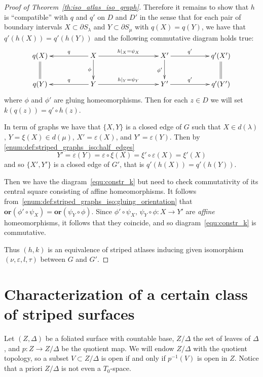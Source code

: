 \documentclass[12pt, reqno]{amsart}
\newcommand\Vsp{V}
\newcommand\dif{h}
\newcommand{\Partition}{\Delta}
\newcommand{\strip}{S}
\newcommand{\stripSurf}{Z}
\newcommand{\bdX}{X}
\newcommand{\bdY}{Y}
\newcommand{\stInd}{{\lambda}}
\newcommand{\qmap}{q}
\newcommand\Gr{G}
\newcommand\ori{\mathbf{or}}
\newcommand\lori{l}
\newcommand\tori{\tau}
\newcommand\edge[2]{\{#1,#2\}}
\newcommand\eiso{\varepsilon}
\newcommand\viso{\nu}
\begin{document}
\begin{proof}[Proof of Theorem~\ref{th:iso_atlas_iso_graph}]
Therefore it remains to show that $\dif$ is ``compatible'' with $\qmap$ and $\qmap'$ on $D$ and $D'$ in the sense that for each pair of boundary intervals $\bdX\subset\partial\strip_{\stInd}$ and $\bdY\subset\partial\strip_{\mu}$ with $\qmap(\bdX) = \qmap(\bdY)$, 
we have that $\qmap'(\dif(\bdX))=\qmap'(\dif(\bdY))$ and the following commutative diagram holds true:
\begin{equation}\label{equ:constr_k}
\xymatrix{
\qmap(\bdX)\ar@{=}[d] && \bdX \ar[ll]_-{\qmap} \ar[rrr]^-{\dif|_{\bdX} = \psi_{\bdX}} \ar[d]_-{\phi} 
&&& \bdX' \ar[rr]^-{\qmap'} \ar[d]_{\phi'} && \qmap'(\bdX')\ar@{=}[d] \\
\qmap(\bdY) && \bdY \ar[ll]_-{\qmap} \ar[rrr]^-{\dif|_{\bdY} = \psi_{\bdY}}
&&& \bdY' \ar[rr]^-{\qmap'}        && \qmap'(\bdY')
}
\end{equation}
where $\phi$ and $\phi'$ are gluing homeomorphisms.
Then for each $z\in D$ we will set $k(\qmap(z)) = \qmap'\circ \dif(z)$.


In term of graphs we have that $\edge{\bdX}{\bdY}$ is a closed edge of $\Gr$ such that $\bdX\in d(\stInd)$, $\bdY=\xi(\bdX)\in d(\mu)$, $\bdX'=\eiso(\bdX)$, and $\bdY'=\eiso(\bdY)$.
Then by \ref{enum:def:striped_graphs_iso:half_edges}
\[
\bdY' = \eiso(\bdY) = \eiso\circ \xi(\bdX) = \xi' \circ \eiso(\bdX) = \xi'(\bdX)
\]
and so $\{\bdX', \bdY'\}$ is a closed edge of $\Gr'$, that is $\qmap'(\dif(\bdX))=\qmap'(\dif(\bdY))$.

Then we have the diagram~\eqref{equ:constr_k} but need to check commutativity of its central square consisting of affine homeomorphisms.
It follows from~\ref{enum:def:striped_graphs_iso:gluing_orientation} that $\ori(\phi' \circ \psi_{\bdX}) = \ori(\psi_{\bdY}\circ \phi)$.
Since $\phi' \circ \psi_{\bdX}, \,\psi_{\bdY}\circ \phi: \bdX \to \bdY'$ are \textit{affine} homeomorphisms, it follows that they coincide, and so diagram~\eqref{equ:constr_k} is commutative.

Thus $(\dif,k)$ is an equivalence of striped atlases inducing given isomorphism $(\viso,\eiso,\lori, \tori)$ between $\Gr$ and $\Gr'$. 
\end{proof}

\section{Characterization of a certain class of striped surfaces}\label{sect:charact_str_prop}
Let $(\stripSurf,\Partition)$ be a foliated surface with countable base, $\stripSurf/\Partition$ the set of leaves of $\Partition$, and $p:\stripSurf\to\stripSurf/\Partition$ be the quotient map.
We will endow $\stripSurf/\Partition$ with the quotient topology, so a subset $\Vsp\subset\stripSurf/\Partition$ is open if and only if $p^{-1}(\Vsp)$ is open in $\stripSurf$.
Notice that a priori $\stripSurf/\Partition$ is not even a $T_0$-space.
\end{document}
